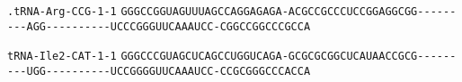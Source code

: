 \documentclass{article}
\newcommand{\rnabox}[1]{\colorbox{#1}{\texttt{#1}}}
\begin{document}
\vspace{-0.5mm}

\texttt{.tRNA-Arg-CCG-1-1}
\rnabox{G}\rnabox{G}\rnabox{G}\rnabox{C}\rnabox{C}\rnabox{G}\rnabox{G}\rnabox{U}\rnabox{A}\rnabox{G}\rnabox{U}\rnabox{U}\rnabox{U}\rnabox{A}\rnabox{G}\rnabox{C}\rnabox{C}\rnabox{A}\rnabox{G}\rnabox{G}\rnabox{A}\rnabox{G}\rnabox{A}\rnabox{G}\rnabox{A}\rnabox{-}\rnabox{A}\rnabox{C}\rnabox{G}\rnabox{C}\rnabox{C}\rnabox{G}\rnabox{C}\rnabox{C}\rnabox{C}\rnabox{U}\rnabox{C}\rnabox{C}\rnabox{G}\rnabox{G}\rnabox{A}\rnabox{G}\rnabox{G}\rnabox{C}\rnabox{G}\rnabox{G}\rnabox{-}\rnabox{-}\rnabox{-}\rnabox{-}\rnabox{-}\rnabox{-}\rnabox{-}\rnabox{-}\rnabox{-}\rnabox{A}\rnabox{G}\rnabox{G}\rnabox{-}\rnabox{-}\rnabox{-}\rnabox{-}\rnabox{-}\rnabox{-}\rnabox{-}\rnabox{-}\rnabox{-}\rnabox{-}\rnabox{U}\rnabox{C}\rnabox{C}\rnabox{C}\rnabox{G}\rnabox{G}\rnabox{G}\rnabox{U}\rnabox{U}\rnabox{C}\rnabox{A}\rnabox{A}\rnabox{A}\rnabox{U}\rnabox{C}\rnabox{C}\rnabox{-}\rnabox{C}\rnabox{G}\rnabox{G}\rnabox{C}\rnabox{C}\rnabox{G}\rnabox{G}\rnabox{C}\rnabox{C}\rnabox{C}\rnabox{G}\rnabox{C}\rnabox{C}\rnabox{A}

\vspace{-0.5mm}

\texttt{tRNA-Ile2-CAT-1-1}
\rnabox{G}\rnabox{G}\rnabox{G}\rnabox{C}\rnabox{C}\rnabox{C}\rnabox{G}\rnabox{U}\rnabox{A}\rnabox{G}\rnabox{C}\rnabox{U}\rnabox{C}\rnabox{A}\rnabox{G}\rnabox{C}\rnabox{C}\rnabox{U}\rnabox{G}\rnabox{G}\rnabox{U}\rnabox{C}\rnabox{A}\rnabox{G}\rnabox{A}\rnabox{-}\rnabox{G}\rnabox{C}\rnabox{G}\rnabox{C}\rnabox{G}\rnabox{C}\rnabox{G}\rnabox{G}\rnabox{C}\rnabox{U}\rnabox{C}\rnabox{A}\rnabox{U}\rnabox{A}\rnabox{A}\rnabox{C}\rnabox{C}\rnabox{G}\rnabox{C}\rnabox{G}\rnabox{-}\rnabox{-}\rnabox{-}\rnabox{-}\rnabox{-}\rnabox{-}\rnabox{-}\rnabox{-}\rnabox{-}\rnabox{U}\rnabox{G}\rnabox{G}\rnabox{-}\rnabox{-}\rnabox{-}\rnabox{-}\rnabox{-}\rnabox{-}\rnabox{-}\rnabox{-}\rnabox{-}\rnabox{-}\rnabox{U}\rnabox{C}\rnabox{C}\rnabox{G}\rnabox{G}\rnabox{G}\rnabox{G}\rnabox{U}\rnabox{U}\rnabox{C}\rnabox{A}\rnabox{A}\rnabox{A}\rnabox{U}\rnabox{C}\rnabox{C}\rnabox{-}\rnabox{C}\rnabox{C}\rnabox{G}\rnabox{C}\rnabox{G}\rnabox{G}\rnabox{G}\rnabox{C}\rnabox{C}\rnabox{C}\rnabox{A}\rnabox{C}\rnabox{C}\rnabox{A}

\vspace{-0.5mm}
\end{document}

